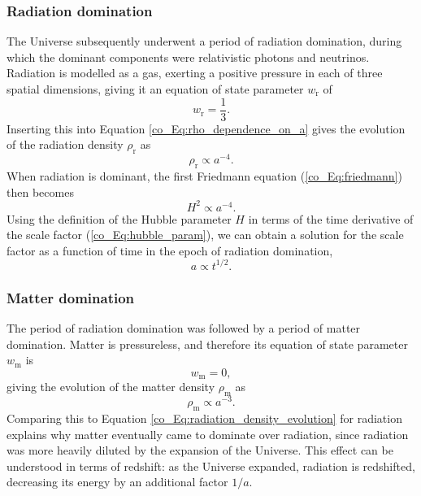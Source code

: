 \subsubsection{Radiation domination}

The Universe subsequently underwent a period of radiation domination, during which the dominant components were relativistic photons and neutrinos. Radiation is modelled as a gas, exerting a positive pressure in each of three spatial dimensions, giving it an equation of state parameter $w_\text{r}$ of
\begin{equation}
w_\text{r} = \frac{1}{3}.
\end{equation}
Inserting this into Equation \eqref{co_Eq:rho_dependence_on_a} gives the evolution of the radiation density $\rho_\text{r}$ as
\begin{equation}
\rho_\text{r} \propto a^{-4}.
\label{co_Eq:radiation_density_evolution}
\end{equation}
When radiation is dominant, the first Friedmann equation (\autoref{co_Eq:friedmann}) then becomes
\begin{equation}
H^2 \propto a^{-4}.
\end{equation}
Using the definition of the Hubble parameter $H$ in terms of the time derivative of the scale factor (\autoref{co_Eq:hubble_param}), we can obtain a solution for the scale factor as a function of time in the epoch of radiation domination,
\begin{equation}
a \propto t^{1/2}.
\end{equation}

\subsubsection{Matter domination}

The period of radiation domination was followed by a period of matter domination. Matter is pressureless, and therefore its equation of state parameter $w_\text{m}$ is
\begin{equation}
w_\text{m} = 0,
\end{equation}
giving the evolution of the matter density $\rho_\text{m}$ as
\begin{equation}
\rho_\text{m} \propto a^{-3}.
\end{equation}
Comparing this to Equation \eqref{co_Eq:radiation_density_evolution} for radiation explains why matter eventually came to dominate over radiation, since radiation was more heavily diluted by the expansion of the Universe. This effect can be understood in terms of redshift: as the Universe expanded, radiation is redshifted, decreasing its energy by an additional factor $1/a$.


